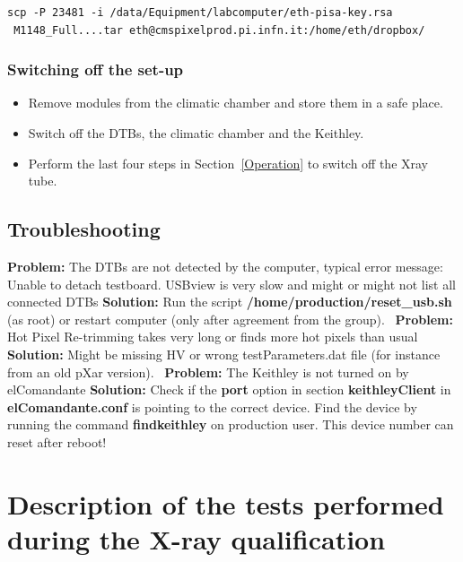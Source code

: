 \documentclass[a4paper,12pt,twoside]{article}
\newcommand{\prob}[1]{{\textbf{Problem: } #1}\newline}
\newcommand{\sol}[1]{{\textbf{Solution: } #1 \newline \,\newline}}
\begin{document}
\begin{Verbatim}[frame=single]
scp -P 23481 -i /data/Equipment/labcomputer/eth-pisa-key.rsa
 M1148_Full....tar eth@cmspixelprod.pi.infn.it:/home/eth/dropbox/
\end{Verbatim}

\subsubsection{Switching off the set-up}

\begin{itemize}
\item Remove modules from the climatic chamber and store them in a safe place.
\item Switch off the DTBs, the climatic chamber and the Keithley.
\item Perform the last four steps in Section~\ref{Operation} to switch off the Xray tube.
\end{itemize}

\subsection{Troubleshooting}

\prob{The DTBs are not detected by the computer, typical error message: Unable to detach testboard. USBview is very slow and might or might not list all connected DTBs}
\sol{Run the script \textbf{/home/production/reset\_usb.sh} (as root) or restart computer (only after agreement from the group).}
\prob{Hot Pixel Re-trimming takes very long or finds more hot pixels than usual}
\sol{Might be missing HV or wrong testParameters.dat file (for instance from an old pXar version).}
\prob{The Keithley is not turned on by elComandante}
\sol{Check if the \textbf{port} option in section \textbf{keithleyClient} in \textbf{elComandante.conf} is pointing to the correct device. Find the device by running the command \mbox{\textbf{findkeithley}} on production user. This device number can reset after reboot!}

\section{Description of the tests performed during the X-ray qualification}
\end{document}
